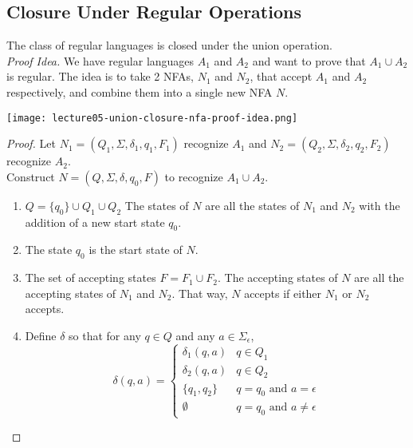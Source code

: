 \documentclass[11pt,a4paper]{article}
\begin{document}
\subsection{Closure Under Regular Operations}
\begin{theorem}
    The class of regular languages is closed under the union operation. \\

    \textit{Proof Idea.} We have regular languages $A_1$ and $A_2$ and want to prove that $A_1\cup A_2$ is regular.
    The idea is to take 2 NFAs, $N_1$ and $N_2$, that accept $A_1$ and $A_2$ respectively, and combine them into a single new NFA $N$.

    \texttt{[image: lecture05-union-closure-nfa-proof-idea.png]}
    \begin{proof}
        Let $N_1=(Q_1,\Sigma,\delta_1,q_1,F_1)$ recognize $A_1$ and $N_2=(Q_2,\Sigma,\delta_2,q_2,F_2)$ recognize $A_2$. \\

        Construct $N=(Q,\Sigma,\delta,q_0,F)$ to recognize $A_1\cup A_2$.

        \begin{enumerate}
            \item $Q=\{q_0\}\cup Q_1\cup Q_2$
            \subitem The states of $N$ are all the states of $N_1$ and $N_2$ with the addition of a new start state $q_0$.
            \item The state $q_0$ is the start state of $N$.
            \item The set of accepting states $F=F_1\cup F_2$.
            \subitem The accepting states of $N$ are all the accepting states of $N_1$ and $N_2$. That way, $N$ accepts if either $N_1$ or $N_2$ accepts.
            \item Define $\delta$ so that for any $q\in Q$ and any $a\in\Sigma_{\epsilon}$,
            $$\delta(q,a)=\begin{cases}
                \delta_1(q,a) & q\in Q_1 \\
                \delta_2(q,a) & q\in Q_2 \\
                \{q_1,q_2\} & q=q_0\text{ and }a=\epsilon \\
                \emptyset & q=q_0\text{ and }a\neq\epsilon
            \end{cases}$$
        \end{enumerate}
    \end{proof}
\end{theorem}
\end{document}
